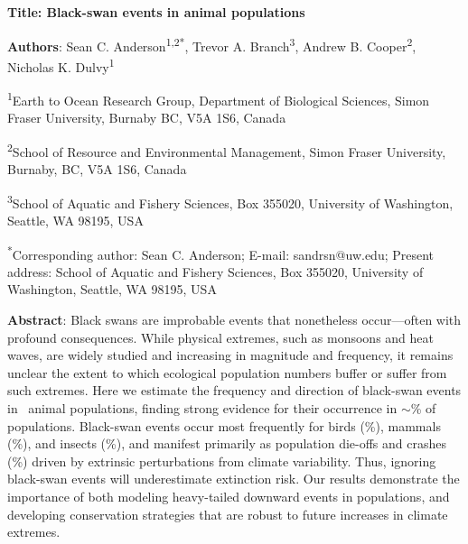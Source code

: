 \textbf{Title: Black-swan events in animal populations}

\textbf{Authors}: Sean C. Anderson\textsuperscript{1,2*}, Trevor A. Branch\textsuperscript{3}, Andrew B. Cooper\textsuperscript{2}, Nicholas K. Dulvy\textsuperscript{1}

\textsuperscript{1}Earth to Ocean Research Group, Department of Biological Sciences, Simon Fraser University, Burnaby BC, V5A 1S6, Canada

\textsuperscript{2}School of Resource and Environmental Management, Simon Fraser University, Burnaby, BC, V5A 1S6, Canada

\textsuperscript{3}School of Aquatic and Fishery Sciences, Box 355020, University of Washington, Seattle, WA 98195, USA

\textsuperscript{*}Corresponding author: Sean C. Anderson; E-mail: sandrsn@uw.edu; Present address: School of Aquatic and Fishery Sciences, Box 355020, University of Washington, Seattle, WA 98195, USA


\textbf{Abstract}: Black swans are improbable events that nonetheless
occur---often with profound consequences. While physical extremes, such as
monsoons and heat waves, are widely studied and increasing in magnitude and
frequency, it remains unclear the extent to which ecological population numbers
buffer or suffer from such extremes. Here we estimate the frequency and
direction of black-swan events in \NPops\ animal populations, finding strong
evidence for their occurrence in \(\sim\)\overallBasePerc \% of populations.
Black-swan events occur most frequently for birds (\birdPH \%), mammals
(\mammalsPH \%), and insects (\insectsPH \%), and manifest primarily as
population die-offs and crashes (\percBSDown \%) driven by extrinsic
perturbations from climate variability. Thus, ignoring black-swan events will
underestimate extinction risk. Our results demonstrate the importance of both
modeling heavy-tailed downward events in populations, and developing
conservation strategies that are robust to future increases in climate
extremes.




